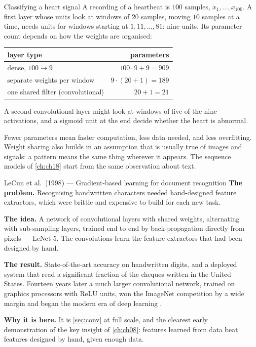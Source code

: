 \begin{workedexample}{Classifying a heart signal}
A recording of a heartbeat is $100$ samples, $x_1,\dots,x_{100}$. A first layer
whose units look at windows of $20$ samples, moving $10$ samples at a time,
needs units for windows starting at $1, 11, \dots, 81$: nine units. Its parameter
count depends on how the weights are organised:

\begin{center}
\small
\renewcommand{\arraystretch}{1.15}
\begin{tabular}{@{}lr@{}}
\toprule
layer type & parameters\\
\midrule
dense, $100\to9$ & $100\cdot9 + 9 = 909$\\
separate weights per window & $9\cdot(20+1) = 189$\\
one shared filter (convolutional) & $20 + 1 = 21$\\
\bottomrule
\end{tabular}
\end{center}

A second convolutional layer might look at windows of five of the nine
activations, and a sigmoid unit at the end decide whether the heart is
abnormal.
\end{workedexample}

Fewer parameters mean faster computation, less data needed, and less
overfitting. Weight sharing also builds in an assumption that is usually true of
images and signals: a pattern means the same thing wherever it appears. The
sequence models of \cref{ch:ch18} start from the same observation about text.

\begin{researchspotlight}{LeCun et al.\ (1998) --- Gradient-based learning for document recognition}
\textbf{The problem.} Recognising handwritten characters needed hand-designed
feature extractors, which were brittle and expensive to build for each new task.

\textbf{The idea.} A network of convolutional layers with shared weights,
alternating with sub-sampling layers, trained end to end by back-propagation
directly from pixels --- LeNet-5. The convolutions learn the feature extractors
that had been designed by hand.

\textbf{The result.} State-of-the-art accuracy on handwritten digits, and a
deployed system that read a significant fraction of the cheques written in the
United States. Fourteen years later a much larger convolutional network, trained
on graphics processors with ReLU units, won the ImageNet competition by a wide
margin and began the modern era of deep learning \parencite{krizhevsky2012}.

\textbf{Why it is here.} It is \cref{sec:conv} at full scale, and the clearest
early demonstration of the key insight of \cref{ch:ch08}: features learned from
data beat features designed by hand, given enough data.
\parencite{lecun1998}
\end{researchspotlight}

